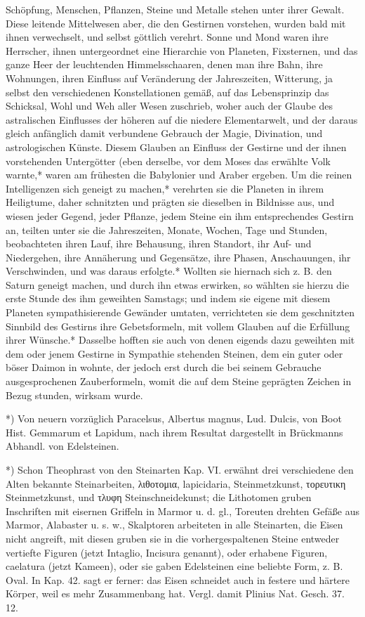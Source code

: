 \documentclass[a4paper, 11pt, oneside, polutonikogreek, german]{article}
\begin{document}
Schöpfung, Menschen, Pflanzen, Steine und Metalle stehen unter ihrer Gewalt. Diese leitende Mittelwesen aber, die den Gestirnen vorstehen, wurden bald mit ihnen verwechselt, und selbst göttlich verehrt. Sonne und Mond waren ihre Herrscher, ihnen untergeordnet eine Hierarchie von Planeten, Fixsternen, und das ganze Heer der leuchtenden Himmelsschaaren, denen man ihre Bahn, ihre Wohnungen, ihren Einfluss auf Veränderung der Jahreszeiten, Witterung, ja selbst den verschiedenen Konstellationen gemäß, auf das Lebensprinzip das Schicksal, Wohl und Weh aller Wesen zuschrieb, woher auch der Glaube des astralischen Einflusses der höheren auf die niedere Elementarwelt, und der daraus gleich anfänglich damit verbundene Gebrauch der Magie, Divination, und astrologischen Künste. Diesem Glauben an Einfluss der Gestirne und der ihnen vorstehenden Untergötter (eben derselbe, vor dem Moses das erwählte Volk warnte,* waren am frühesten die Babylonier und Araber ergeben. Um die reinen Intelligenzen sich geneigt zu machen,* verehrten sie die Planeten in ihrem Heiligtume, daher schnitzten und prägten sie dieselben in Bildnisse aus, und wiesen jeder Gegend, jeder Pflanze, jedem Steine ein ihm entsprechendes Gestirn an, teilten unter sie die Jahreszeiten, Monate, Wochen, Tage und Stunden, beobachteten ihren Lauf, ihre Behausung, ihren Standort, ihr Auf- und Niedergehen, ihre Annäherung und Gegensätze, ihre Phasen, Anschauungen, ihr Verschwinden, und was daraus erfolgte.* Wollten sie hiernach sich z. B. den Saturn geneigt machen, und durch ihn etwas erwirken, so wählten sie hierzu die erste Stunde des ihm geweihten Samstags; und indem sie eigene mit diesem Planeten sympathisierende Gewänder umtaten, verrichteten sie dem geschnitzten Sinnbild des Gestirns ihre Gebetsformeln, mit vollem Glauben auf die Erfüllung ihrer Wünsche.* Dasselbe hofften sie auch von denen eigends dazu geweihten mit dem oder jenem Gestirne in Sympathie stehenden Steinen, dem ein guter oder böser Daimon in wohnte, der jedoch erst durch die bei seinem Gebrauche ausgesprochenen Zauberformeln, womit die auf dem Steine geprägten Zeichen in Bezug stunden, wirksam wurde.

*) Von neuern vorzüglich Paracelsus, Albertus magnus, Lud. Dulcis, von Boot Hist. Gemmarum et Lapidum, nach ihrem Resultat dargestellt in Brückmanns Abhandl. von Edelsteinen.

*) Schon Theophrast von den Steinarten Kap. VI. erwähnt drei verschiedene den Alten bekannte Steinarbeiten, λιθοτομια, lapicidaria, Steinmetzkunst, τορευτικη Steinmetzkunst, und τλυφη Steinschneidekunst; die Lithotomen gruben Inschriften mit eisernen Griffeln in Marmor u. d. gl., Toreuten drehten Gefäße aus Marmor, Alabaster u. s. w., Skalptoren arbeiteten in alle Steinarten, die Eisen nicht angreift, mit diesen gruben sie in die vorhergespaltenen Steine entweder vertiefte Figuren (jetzt Intaglio, Incisura genannt), oder erhabene Figuren, caelatura (jetzt Kameen), oder sie gaben Edelsteinen eine beliebte Form, z. B. Oval. In Kap. 42. sagt er ferner: das Eisen schneidet auch in festere und härtere Körper, weil es mehr Zusammenbang hat. Vergl. damit Plinius Nat. Gesch. 37. 12.
\end{document}
